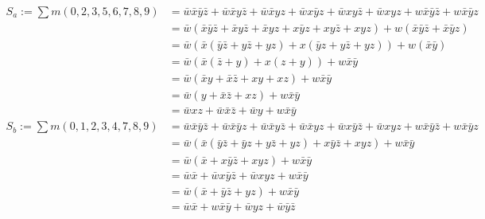 \documentclass{article}
\begin{document}
    \begin{align*}
        S_a := \sum m(0, 2, 3, 5, 6, 7, 8, 9) &= \bar{w}\bar{x}\bar{y}\bar{z} + \bar{w}\bar{x}y\bar{z} + \bar{w}\bar{x}yz + \bar{w}x\bar{y}z + \bar{w}xy\bar{z} + \bar{w}xyz + w\bar{x}\bar{y}\bar{z} + w\bar{x}\bar{y}z\\
        &= \bar{w}(\bar{x}\bar{y}\bar{z} + \bar{x}y\bar{z} + \bar{x}yz + x\bar{y}z + xy\bar{z} + xyz) + w(\bar{x}\bar{y}\bar{z} + \bar{x}\bar{y}z)\\
        &= \bar{w}(\bar{x}(\bar{y}\bar{z} + y\bar{z} + yz) + x(\bar{y}z + y\bar{z} + yz)) + w(\bar{x}\bar{y})\\
        &= \bar{w}(\bar{x}(\bar{z} + y) + x(z + y)) + w\bar{x}\bar{y}\\
        &= \bar{w}(\bar{x}y + \bar{x}\bar{z} + xy + xz) + w\bar{x}\bar{y}\\ 
        &= \bar{w}(y + \bar{x}\bar{z} + xz) + w\bar{x}\bar{y}\\
        &= \bar{w}xz + \bar{w}\bar{x}\bar{z} +  \bar{w}y + w\bar{x}\bar{y}\\ 
        S_b := \sum m(0, 1, 2, 3, 4, 7, 8, 9) &= \bar{w}\bar{x}\bar{y}\bar{z} + \bar{w}\bar{x}\bar{y}z + \bar{w}\bar{x}y\bar{z} + \bar{w}\bar{x}yz + \bar{w}x\bar{y}\bar{z} + \bar{w}xyz + w\bar{x}\bar{y}\bar{z} + w\bar{x}\bar{y}z\\
        &= \bar{w}(\bar{x}(\bar{y}\bar{z} + \bar{y}z + y\bar{z} + yz) + x\bar{y}\bar{z} + xyz) + w\bar{x}\bar{y} \\
        &= \bar{w}(\bar{x} + x\bar{y}\bar{z} + xyz) + w\bar{x}\bar{y} \\
        &= \bar{w}\bar{x} + \bar{w}x\bar{y}\bar{z} + \bar{w}xyz + w\bar{x}\bar{y}\\
        &= \bar{w}(\bar{x} + \bar{y}\bar{z} + yz) + w\bar{x}\bar{y}\\
        &= \bar{w}\bar{x} + w\bar{x}\bar{y}+ \bar{w}yz + \bar{w}\bar{y}\bar{z} \\
    \end{align*}

    \newpage
\end{document}
